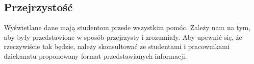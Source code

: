 \documentclass{article}
\begin{document}
\subsection{Przejrzystość}
Wyświetlane dane mają studentom przede wszystkim pomóc.
Zależy nam na tym, aby były przedstawione w sposób przejrzysty i zrozumiały.
Aby upewnić się, że rzeczywiście tak będzie, należy skonsultować ze studentami i pracownikami dziekanatu proponowany format przedstawianych informacji.
\end{document}
